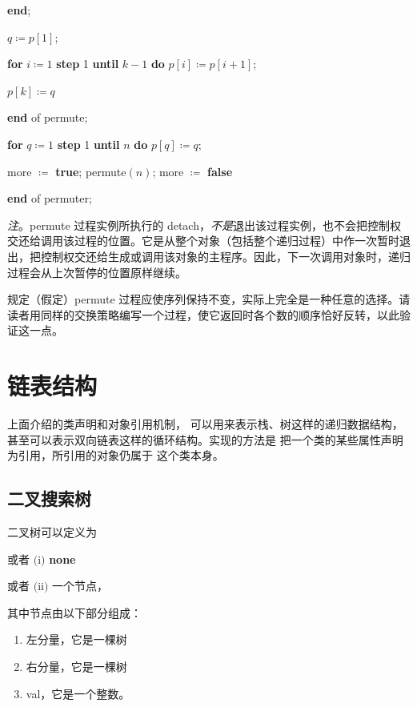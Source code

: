 \quad \quad \quad \textbf{end};

\quad \quad \quad $q\coloneq p[1]$;

\quad \quad \quad \textbf{for} $i\coloneq 1$ \textbf{step} 1 \textbf{until} $k - 1$ \textbf{do} $p[i] \coloneq p[i + 1]$;

\quad \quad \quad $p[k]\coloneq q$

\quad \quad \textbf{end} of permute;

\quad \quad \textbf{for} $q\coloneq 1$ \textbf{step} 1 \textbf{until} $n$ \textbf{do} $p[q] \coloneq q$;

\quad \quad \quad more $\coloneq$ \textbf{true}; permute$(n)$; more $\coloneq$ \textbf{false}

\quad \textbf{end} of permuter;

\textit{注}。permute 过程实例所执行的 detach，\textit{不是}退出该过程实例，也不会把控制权交还给调用该过程的位置。它是从整个对象（包括整个递归过程）中作一次暂时退出，把控制权交还给生成或调用该对象的主程序。因此，下一次调用对象时，递归过程会从上次暂停的位置原样继续。

规定（假定）permute 过程应使序列保持不变，实际上完全是一种任意的选择。请读者用同样的交换策略编写一个过程，使它返回时各个数的顺序恰好反转，以此验证这一点。

\section[链表结构]{链表结构}

上面介绍的类声明和对象引用机制，
可以用来表示栈、树这样的递归数据结构，
甚至可以表示双向链表这样的循环结构。实现的方法是
把一个类的某些属性声明为引用，所引用的对象仍属于
这个类本身。

\subsection{二叉搜索树}

二叉树可以定义为

\quad 或者 \tabto*{5.35em}$($i$)$ \tabto*{7.35em}\textbf{none}

\tabto*{4em}或者 $($ii$)$ 一个节点，

\noindent
其中节点由以下部分组成：

\begin{enumerate}[wide, nosep, label=(\alph*)]
	\item 左分量，它是一棵树
	\item 右分量，它是一棵树
	\item val，它是一个整数。
\end{enumerate}


